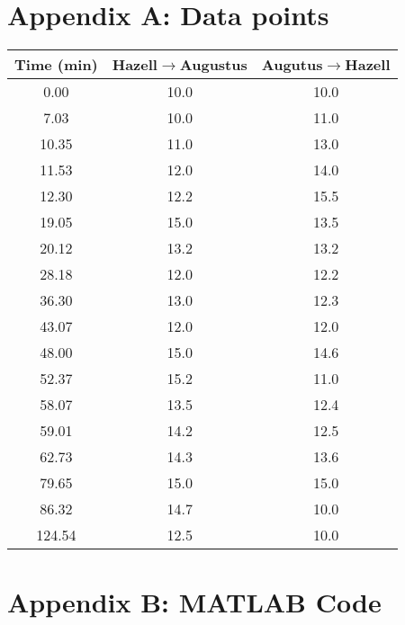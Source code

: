 \documentclass{article}
\begin{document}
\newpage
\section*{\hypertarget{AppendixA}{Appendix A}: Data points}
\begin{center}
\begin{tabular}{|c|c|c|}
\hline
Time (min) & Hazell$\rightarrow$Augustus &Augutus$\rightarrow$Hazell\\\hline
0.00 & 10.0 & 10.0 \\\hline
7.03 & 10.0 & 11.0 \\\hline
10.35 & 11.0 & 13.0 \\\hline
11.53 & 12.0 & 14.0 \\\hline
12.30 & 12.2 & 15.5 \\\hline
19.05 & 15.0 & 13.5 \\\hline
20.12 & 13.2 & 13.2 \\\hline
28.18 & 12.0 & 12.2 \\\hline
36.30 & 13.0 & 12.3 \\\hline
43.07 & 12.0 & 12.0 \\\hline
48.00 & 15.0 & 14.6 \\\hline
52.37 & 15.2 & 11.0 \\\hline
58.07 & 13.5 & 12.4 \\\hline
59.01 & 14.2 & 12.5 \\\hline
62.73 & 14.3 & 13.6 \\\hline
79.65 & 15.0 & 15.0 \\\hline
86.32 & 14.7 & 10.0 \\\hline
124.54 & 12.5 & 10.0 \\\hline
\end{tabular}
\end{center}
\newpage
\section*{Appendix B: MATLAB Code}
\end{document}
